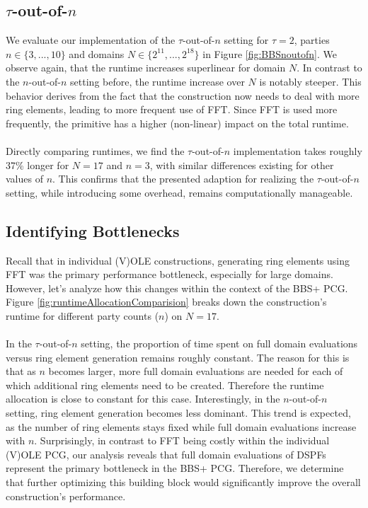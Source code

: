\subsection{$\tau$-out-of-$n$}
We evaluate our implementation of the $\tau$-out-of-$n$ setting for $\tau = 2$, parties $n\in \{3, ..., 10\}$ and domains $N\in \{2^{11}, ...,2^{18}\}$ in Figure \ref{fig:BBSnoutofn}. We observe again, that the runtime increases superlinear for domain $N$. In contrast to the $n$-out-of-$n$ setting before, the runtime increase over $N$ is notably steeper. This behavior derives from the fact that the construction now needs to deal with more ring elements, leading to more frequent use of FFT. Since FFT is used more frequently, the primitive has a higher (non-linear) impact on the total runtime. 
\\\\
Directly comparing runtimes, we find the $\tau$-out-of-$n$ implementation takes roughly 37\% longer for $N=17$ and $n=3$, with similar differences existing for other values of $n$. This confirms that the presented adaption for realizing the $\tau$-out-of-$n$ setting, while introducing some overhead, remains computationally manageable.

\subsection{Identifying Bottlenecks}
Recall that in individual (V)OLE constructions, generating ring elements using FFT was the primary performance bottleneck, especially for large domains. However, let's analyze how this changes within the context of the BBS+ PCG. Figure \ref{fig:runtimeAllocationComparision} breaks down the construction's runtime for different party counts ($n$) on $N=17$.
\\\\
In the $\tau$-out-of-$n$ setting, the proportion of time spent on full domain evaluations versus ring element generation remains roughly constant. The reason for this is that as $n$ becomes larger, more full domain evaluations are needed for each of which additional ring elements need to be created. Therefore the runtime allocation is close to constant for this case. Interestingly, in the $n$-out-of-$n$ setting, ring element generation becomes less dominant. This trend is expected, as the number of ring elements stays fixed while full domain evaluations increase with $n$.  Surprisingly, in contrast to FFT being costly within the individual (V)OLE PCG, our analysis reveals that full domain evaluations of DSPFs represent the primary bottleneck in the BBS+ PCG. Therefore, we determine that further optimizing this building block would significantly improve the overall construction's performance.

